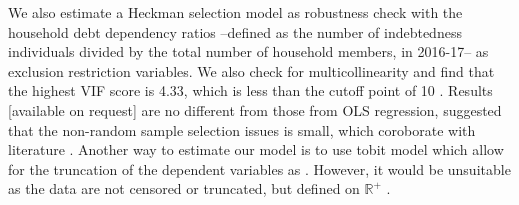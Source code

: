 \documentclass[a4paper, 11pt, onecolumn]{article}
\newcommand{\PTCS}{PT\&CS}
\begin{document}
We also estimate a Heckman selection model as robustness check with the household debt dependency ratios --defined as the number of indebtedness individuals divided by the total number of household members, in 2016-17-- as exclusion restriction variables.
We also check for multicollinearity and find that the highest VIF score is 4.33, which is less than the cutoff point of 10 \citep{Lennox2011}.
Results [available on request] are no different from those from OLS regression, suggested that the non-random sample selection issues is small, which coroborate with literature \citep{Rio2006, Brown2014}.
Another way to estimate our model is to use tobit model which allow for the truncation of the dependent variables as \cite{Brown2014, Cox1993}.
However, it would be unsuitable as the data are not censored or truncated, but defined on $\mathbb{R}^{+}$ \citep{Maddala1991}.


\end{document}
